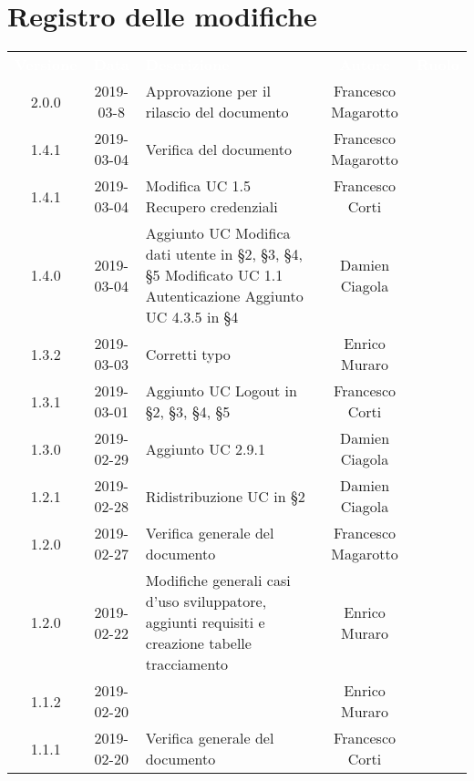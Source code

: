 \section*{Registro delle modifiche}
{
	\renewcommand{\arraystretch}{1.5}
	\centering
	\begin{longtable}{ c c C{6cm} c c }
		\textcolor{white}{\textbf{Versione}} & \textcolor{white}{\textbf{Data}} & \textcolor{white}{\textbf{Descrizione}} & \textcolor{white}{\textbf{Autore}} & \textcolor{white}{\textbf{Ruolo}}\\
		2.0.0 &
		2019-03-8 &
		Approvazione per il rilascio del documento &
		Francesco Magarotto &
		\Res{} \\
		1.4.1 &
		2019-03-04 &
		Verifica del documento &
		Francesco Magarotto &
		\ver{} \\
		1.4.1 &
		2019-03-04 &
		Modifica UC 1.5 Recupero credenziali &
		Francesco Corti &
		\reda{} \\
		1.4.0 & 
		2019-03-04 &
		Aggiunto UC Modifica dati utente in §2, §3, §4, §5 \newline Modificato UC 1.1 Autenticazione \newline Aggiunto UC 4.3.5 in §4 &
		Damien Ciagola &
		\reda{} \\
		1.3.2 & 
		2019-03-03 &
		Corretti typo &
		Enrico Muraro &
		\reda{} \\
		1.3.1 &
		2019-03-01 &
		Aggiunto UC Logout in §2, §3, §4, §5 &
		Francesco Corti &
		\reda{} \\
		1.3.0 &
		2019-02-29 &
		Aggiunto UC 2.9.1 &
		Damien Ciagola&
		\reda{} \\
		1.2.1 &
		2019-02-28 &
		Ridistribuzione UC in §2 &
		Damien Ciagola&
		\reda{} \\	
		
		1.2.0 & 
		2019-02-27 &  
		Verifica generale del documento & 	
		Francesco Magarotto  &	
		\ver{} \\
		
		1.2.0 &
		2019-02-22 &
		Modifiche generali casi d'uso sviluppatore, aggiunti requisiti e creazione tabelle tracciamento &
		Enrico Muraro&
		\reda{} \\	
		
		1.1.2 &
		2019-02-20 &
		&
		Enrico Muraro&
		\reda{} \\		
				
		1.1.1 &
		2019-02-20 &
		Verifica generale del documento&
		Francesco Corti&
		\reda{} \\		
				

\end{longtable}}
